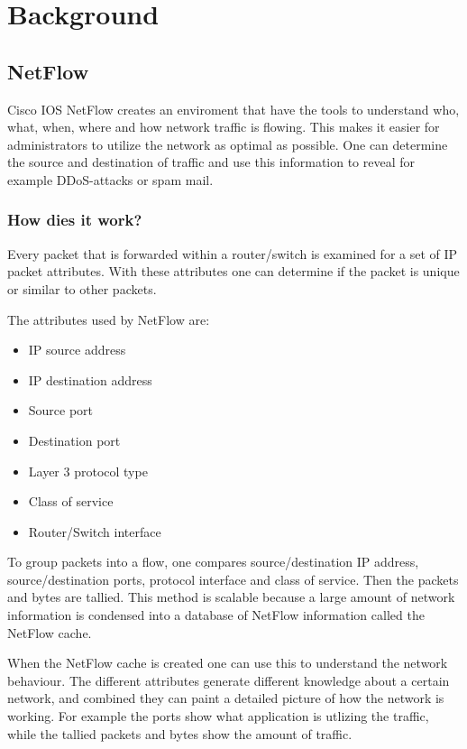 \chapter{Background}
\label{chp:background} 

\section{NetFlow}
Cisco IOS NetFlow creates an enviroment that have the tools to understand who, what, when, where and how network traffic is flowing. This makes it easier for administrators to utilize the network as optimal as possible. One can determine the source and destination of traffic and use this information to reveal for example DDoS-attacks or spam mail. 

\subsection{How dies it work?}
Every packet that is forwarded within a router/switch is examined for a set of IP packet attributes. With these attributes one can determine if the packet is unique or similar to other packets. 

The attributes used by NetFlow are:
\begin{itemize}
\item IP source address
\item IP destination address
\item Source port
\item Destination port
\item Layer 3 protocol type
\item Class of service
\item Router/Switch interface
\end{itemize}

To group packets into a flow, one compares source/destination IP address, source/destination ports, protocol interface and class of service. Then the packets and bytes are tallied. This method is scalable because a large amount of network information is condensed into a database of NetFlow information called the NetFlow cache. 

When the NetFlow cache is created one can use this to understand the network behaviour. The different attributes generate different knowledge about a certain network, and combined they can paint a detailed picture of how the network is working. For example the ports show what application is utlizing the traffic, while the tallied packets and bytes show the amount of traffic. 

